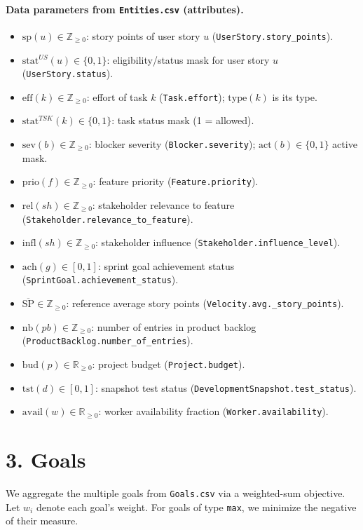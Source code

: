 \documentclass[11pt,a4paper]{article}
\begin{document}
\paragraph{Data parameters from \texttt{Entities.csv} (attributes).}
\begin{itemize}[leftmargin=2em]
  \item $\text{sp}(u) \in \mathbb{Z}_{\ge 0}$: story points of user story $u$ (\texttt{UserStory.story\_points}).
  \item $\text{stat}^{US}(u) \in \{0,1\}$: eligibility/status mask for user story $u$ (\texttt{UserStory.status}).
  \item $\text{eff}(k) \in \mathbb{Z}_{\ge 0}$: effort of task $k$ (\texttt{Task.effort}); $\text{type}(k)$ is its type.
  \item $\text{stat}^{TSK}(k) \in \{0,1\}$: task status mask (1 = allowed).
  \item $\text{sev}(b) \in \mathbb{Z}_{\ge 0}$: blocker severity (\texttt{Blocker.severity}); $\text{act}(b)\in\{0,1\}$ active mask.
  \item $\text{prio}(f)\in\mathbb{Z}_{\ge 0}$: feature priority (\texttt{Feature.priority}).
  \item $\text{rel}(sh)\in\mathbb{Z}_{\ge 0}$: stakeholder relevance to feature (\texttt{Stakeholder.relevance\_to\_feature}).
  \item $\text{infl}(sh)\in\mathbb{Z}_{\ge 0}$: stakeholder influence (\texttt{Stakeholder.influence\_level}).
  \item $\text{ach}(g)\in[0,1]$: sprint goal achievement status (\texttt{SprintGoal.achievement\_status}).
  \item $\overline{\text{SP}} \in \mathbb{Z}_{\ge 0}$: reference average story points (\texttt{Velocity.avg.\_story\_points}).
  \item $\text{nb}(pb)\in\mathbb{Z}_{\ge 0}$: number of entries in product backlog (\texttt{ProductBacklog.number\_of\_entries}).
  \item $\text{bud}(p)\in\mathbb{R}_{\ge 0}$: project budget (\texttt{Project.budget}).
  \item $\text{tst}(d)\in[0,1]$: snapshot test status (\texttt{DevelopmentSnapshot.test\_status}).
  \item $\text{avail}(w)\in\mathbb{R}_{\ge 0}$: worker availability fraction (\texttt{Worker.availability}).
\end{itemize}

\section{3. Goals}
We aggregate the multiple goals from \texttt{Goals.csv} via a weighted-sum objective. Let $w_i$ denote each goal's weight. For goals of type \texttt{max}, we minimize the negative of their measure.
\end{document}
